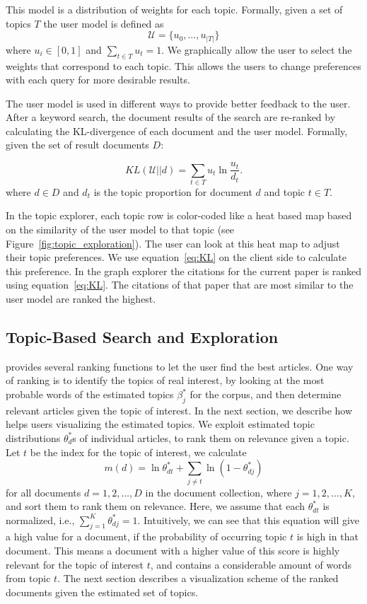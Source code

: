 This model is a distribution of weights for each topic.
Formally, given a set of topics $T$ the user model is defined as
$$
\mathcal{U} = \{u_0, \ldots, u_{|T|}\}
$$
where $u_i \in [0,1]$ and $\sum_{t \in T} u_t = 1$.
We graphically allow the user to select the weights that correspond to
each topic. This allows the users to change preferences with each query
for more desirable results.

The user model is used in different ways to provide better feedback to
the user. After a keyword search, the document results of the search 
are re-ranked by calculating the KL-divergence of each document and the
user model. Formally, given the set of result documents $D$:

\begin{equation} \label{eq:KL}
KL(\mathcal{U}||d) = \sum_{t \in T} u_t \ln \frac{u_t}{d_t}.
\end{equation}
where $d \in D$ and $d_t$ is the topic proportion for document $d$ and
topic $t \in T$. 

In the topic explorer, each topic row is color-coded like a heat 
based map based on the similarity of the user model to that topic (see Figure~\ref{fig:topic_exploration}).
The user can look at this heat map to adjust their topic preferences.
We use equation~\ref{eq:KL} on the client side to calculate this preference. 
In the graph explorer the citations for the current paper is ranked
using equation~\ref{eq:KL}. The citations of that paper that are most
similar to the user model are ranked the highest.


\subsection{Topic-Based Search and Exploration}

\system provides several ranking functions to let the user find  
the best articles. One way of ranking is to identify the topics of 
real interest, by looking at the most probable words of the estimated 
topics $\beta_j^{*}$ for the corpus, and then determine relevant 
articles given the topic of interest. In the next section, we 
describe how \system helps users visualizing the estimated topics. 
We exploit estimated topic distributions $\theta_d^{*}$s of 
individual articles, to rank them on relevance given a topic. Let 
$t$ be the index for the topic of interest, we calculate
\cite{George2012}
\begin{equation}
m(d) = \ln \theta^*_{dt} + \sum_{j \neq t}{\ln (1 - \theta^*_{dj})}
\end{equation}
for all documents $d = 1, 2, \ldots, D$ in the document collection, 
where $j = 1, 2, \ldots, K$, and sort them to rank them on relevance. 
Here, we assume that each $\theta^*_{dt}$ is normalized, i.e., 
$\sum_{j=1}^{K}{\theta^*_{dj}} = 1$. Intuitively, we can see that 
this equation will give a high value for a document, if the probability 
of occurring topic $t$ is high in that document. This means a 
document with a higher value of this score is highly relevant for 
the topic of interest $t$, and contains a considerable amount of 
words from topic $t$. The next section describes a visualization 
scheme of the ranked documents given the estimated set of topics.      


